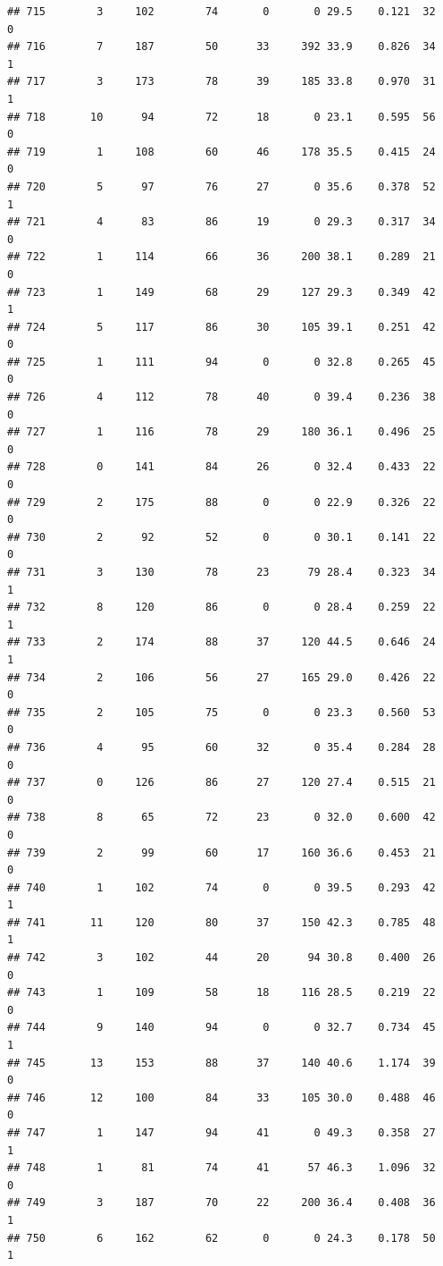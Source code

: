 \documentclass[11pt, a4paper]{article}\usepackage[]{graphicx}\usepackage[]{xcolor}
\makeatletter
\newenvironment{kframe}{%
 \def\at@end@of@kframe{}%
 \ifinner\ifhmode%
  \def\at@end@of@kframe{\end{minipage}}%
  \begin{minipage}{\columnwidth}%
 \fi\fi%
 \def\FrameCommand##1{\hskip\@totalleftmargin \hskip-\fboxsep
 \colorbox{shadecolor}{##1}\hskip-\fboxsep
     \hskip-\linewidth \hskip-\@totalleftmargin \hskip\columnwidth}%
 \MakeFramed {\advance\hsize-\width
   \@totalleftmargin\z@ \linewidth\hsize
   \@setminipage}}%
 {\par\unskip\endMakeFramed%
 \at@end@of@kframe}
\newenvironment{knitrout}{}{} %
\makeatother
\begin{document}
\begin{knitrout}
\begin{kframe}
\begin{verbatim}
## 715        3     102        74       0       0 29.5    0.121  32    0
## 716        7     187        50      33     392 33.9    0.826  34    1
## 717        3     173        78      39     185 33.8    0.970  31    1
## 718       10      94        72      18       0 23.1    0.595  56    0
## 719        1     108        60      46     178 35.5    0.415  24    0
## 720        5      97        76      27       0 35.6    0.378  52    1
## 721        4      83        86      19       0 29.3    0.317  34    0
## 722        1     114        66      36     200 38.1    0.289  21    0
## 723        1     149        68      29     127 29.3    0.349  42    1
## 724        5     117        86      30     105 39.1    0.251  42    0
## 725        1     111        94       0       0 32.8    0.265  45    0
## 726        4     112        78      40       0 39.4    0.236  38    0
## 727        1     116        78      29     180 36.1    0.496  25    0
## 728        0     141        84      26       0 32.4    0.433  22    0
## 729        2     175        88       0       0 22.9    0.326  22    0
## 730        2      92        52       0       0 30.1    0.141  22    0
## 731        3     130        78      23      79 28.4    0.323  34    1
## 732        8     120        86       0       0 28.4    0.259  22    1
## 733        2     174        88      37     120 44.5    0.646  24    1
## 734        2     106        56      27     165 29.0    0.426  22    0
## 735        2     105        75       0       0 23.3    0.560  53    0
## 736        4      95        60      32       0 35.4    0.284  28    0
## 737        0     126        86      27     120 27.4    0.515  21    0
## 738        8      65        72      23       0 32.0    0.600  42    0
## 739        2      99        60      17     160 36.6    0.453  21    0
## 740        1     102        74       0       0 39.5    0.293  42    1
## 741       11     120        80      37     150 42.3    0.785  48    1
## 742        3     102        44      20      94 30.8    0.400  26    0
## 743        1     109        58      18     116 28.5    0.219  22    0
## 744        9     140        94       0       0 32.7    0.734  45    1
## 745       13     153        88      37     140 40.6    1.174  39    0
## 746       12     100        84      33     105 30.0    0.488  46    0
## 747        1     147        94      41       0 49.3    0.358  27    1
## 748        1      81        74      41      57 46.3    1.096  32    0
## 749        3     187        70      22     200 36.4    0.408  36    1
## 750        6     162        62       0       0 24.3    0.178  50    1

\end{verbatim}
\end{kframe}
\end{knitrout}
\end{document}
